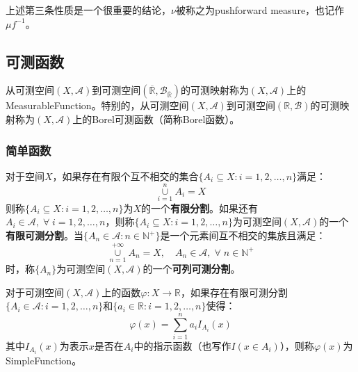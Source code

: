 \begin{note}
	上述第三条性质是一个很重要的结论，$\nu$被称之为pushforward measure，也记作$\mu f^{-1}$。
\end{note}

\subsection{可测函数}
\begin{definition}
	从可测空间$(X,\mathscr{A})$到可测空间$(\overline{\mathbb{R}},\mathcal{B}_{\overline{\mathbb{R}}})$的可测映射称为$(X,\mathscr{A})$上的\gls{MeasurableFunction}。特别的，从可测空间$(X,\mathscr{A})$到可测空间$(\mathbb{R},\mathcal{B})$的可测映射称为$(X,\mathscr{A})$上的Borel可测函数（简称Borel函数）。
\end{definition}
\subsubsection{简单函数}
\begin{definition}
	对于空间$X$，如果存在有限个互不相交的集合$\{A_i\subseteq X:i=1,2,\dots,n\}$满足：
	\begin{equation*}
		\underset{i=1}{\overset{n}{\cup}}A_i=X
	\end{equation*}
	则称$\{A_i\subseteq X:i=1,2,\dots,n\}$为$X$的一个\textbf{有限分割}。如果还有$A_i\in\mathscr{A},\;\forall\;i=1,2,\dots,n$，则称$\{A_i\subseteq X:i=1,2,\dots,n\}$为可测空间$(X,\mathscr{A})$的一个\textbf{有限可测分割}。当$\{A_n\in\mathscr{A}:n\in\mathbb{N}^+\}$是一个元素间互不相交的集族且满足：
	\begin{equation*}
		\underset{n=1}{\overset{+\infty}{\cup}}A_n=X,\quad A_n\in\mathscr{A},\;\forall\;n\in\mathbb{N}^+
	\end{equation*}
	时，称$\{A_n\}$为可测空间$(X,\mathscr{A})$的一个\textbf{可列可测分割}。
\end{definition}
\begin{definition}
	对于可测空间$(X,\mathscr{A})$上的函数$\varphi:X\rightarrow \mathbb{R}$，如果存在有限可测分割$\{A_i\in\mathscr{A}:i=1,2,\dots,n\}$和$\{a_i\in\mathbb{R}:i=1,2,\dots,n\}$使得：
	\begin{equation*}
		\varphi(x)=\sum_{i=1}^{n}a_iI_{A_i}(x)
	\end{equation*}
	其中$I_{A_i}(x)$为表示$x$是否在$A_i$中的指示函数（也写作$I(x\in A_i)$），则称$\varphi(x)$为\gls{SimpleFunction}。
\end{definition}
